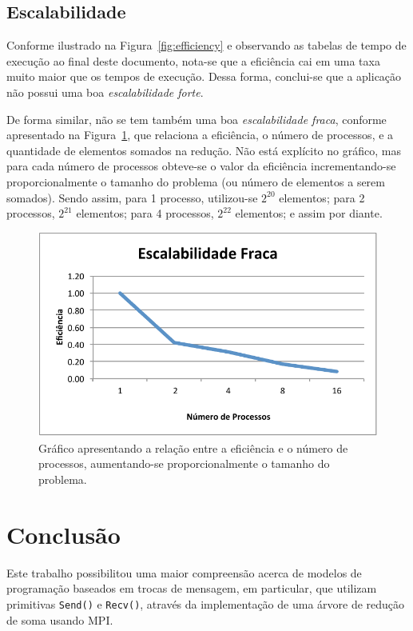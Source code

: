 \documentclass[12pt,a4paper]{article}
\begin{document}
\subsection{Escalabilidade}

Conforme ilustrado na Figura~\ref{fig:efficiency} e observando as tabelas de
tempo de execução ao final deste documento, nota-se que a eficiência cai em uma
taxa muito maior que os tempos de execução. Dessa forma, conclui-se que a
aplicação não possui uma boa \emph{escalabilidade forte}.

De forma similar, não se tem também uma boa \emph{escalabilidade fraca},
conforme apresentado na Figura~\ref{fig:weak-scalability}, que relaciona a
eficiência, o número de processos, e a quantidade de elementos somados na
redução. Não está explícito no gráfico, mas para cada número de processos
obteve-se o valor da eficiência incrementando-se proporcionalmente o tamanho do
problema (ou número de elementos a serem somados). Sendo assim, para 1 processo,
utilizou-se $2^{20}$ elementos; para 2 processos, $2^{21}$ elementos; para 4
processos, $2^{22}$ elementos; e assim por diante.

\begin{figure}[h!]
\centering
\includegraphics{img/weak-scalability.pdf}
\caption{Gráfico apresentando a relação entre a eficiência e o número de
processos, aumentando-se proporcionalmente o tamanho do problema.}
\label{fig:weak-scalability}
\end{figure}

\pagebreak
\section{Conclusão}
Este trabalho possibilitou uma maior compreensão acerca de modelos de
programação baseados em trocas de mensagem, em particular, que utilizam
primitivas \texttt{Send()} e \texttt{Recv()}, através da implementação de uma
árvore de redução de soma usando MPI\@.
\end{document}
